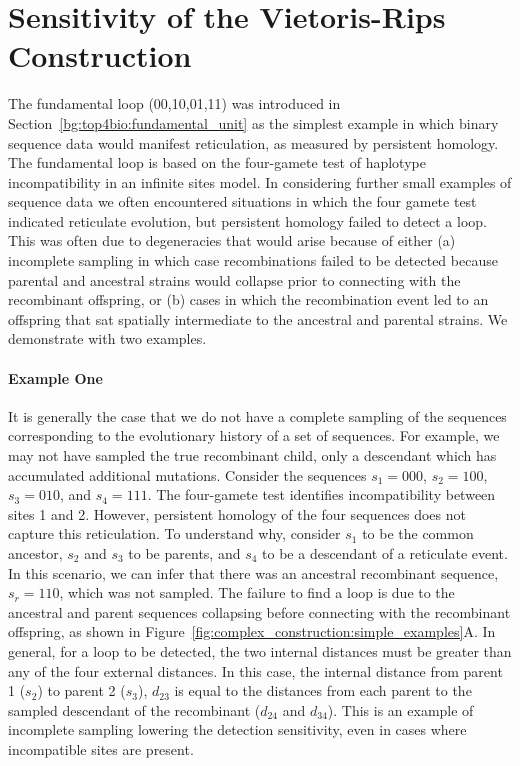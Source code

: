 \section{Sensitivity of the Vietoris-Rips Construction}
\label{complex_construction:sensitivity}

The fundamental loop (00,10,01,11) was introduced in Section~\ref{bg:top4bio:fundamental_unit} as the simplest example in which binary sequence data would manifest reticulation, as measured by persistent homology.
The fundamental loop is based on the four-gamete test of haplotype incompatibility in an infinite sites model.
In considering further small examples of sequence data we often encountered situations in which the four gamete test indicated reticulate evolution, but persistent homology failed to detect a loop.
This was often due to degeneracies that would arise because of either (a) incomplete sampling in which case recombinations failed to be detected because parental and ancestral strains would collapse prior to connecting with the recombinant offspring, or (b) cases in which the recombination event led to an offspring that sat spatially intermediate to the ancestral and parental strains.
We demonstrate with two examples.

\paragraph{Example One}
\label{ex:example1}
%
It is generally the case that we do not have a complete sampling of the sequences corresponding to the evolutionary history of a set of sequences.
For example, we may not have sampled the true recombinant child, only a descendant which has accumulated additional mutations.
Consider the sequences $s_1=000$, $s_2=100$, $s_3=010$, and $s_4=111$.
The four-gamete test identifies incompatibility between sites 1 and 2.
However, persistent homology of the four sequences does not capture this reticulation.
To understand why, consider $s_1$ to be the common ancestor, $s_2$ and $s_3$ to be parents, and $s_4$ to be a descendant of a reticulate event.
In this scenario, we can infer that there was an ancestral recombinant sequence, $s_r=110$, which was not sampled.
The failure to find a loop is due to the ancestral and parent sequences collapsing before connecting with the recombinant offspring, as shown in Figure~\ref{fig:complex_construction:simple_examples}A.
In general, for a loop to be detected, the two internal distances must be greater than any of the four external distances.
In this case, the internal distance from parent 1 ($s_2$) to parent 2 ($s_3$), $d_{23}$ is equal to the distances from each parent to the sampled descendant of the recombinant ($d_{24}$ and $d_{34}$).
This is an example of incomplete sampling lowering the detection sensitivity, even in cases where incompatible sites are present.


